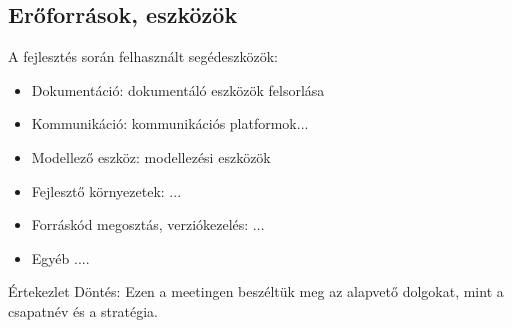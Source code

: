 \documentclass[../../projlab]{subfiles}
\begin{document}
\subsection{Erőforrások, eszközök}
A fejlesztés során felhasznált segédeszközök:
\begin{itemize}
	\item Dokumentáció: dokumentáló eszközök felsorlása
	\item Kommunikáció: kommunikációs platformok...
	\item Modellező eszköz: modellezési eszközök
	\item Fejlesztő környezetek: ...
	\item Forráskód megosztás, verziókezelés: ...
	\item Egyéb ....
\end{itemize}


\clearpage

\begin{naplo}
	{ Értekezlet
		\newline Döntés: Ezen a meetingen beszéltük meg az alapvető dolgokat, mint a csapatnév és a stratégia.
	}
\end{naplo}
\end{document}

